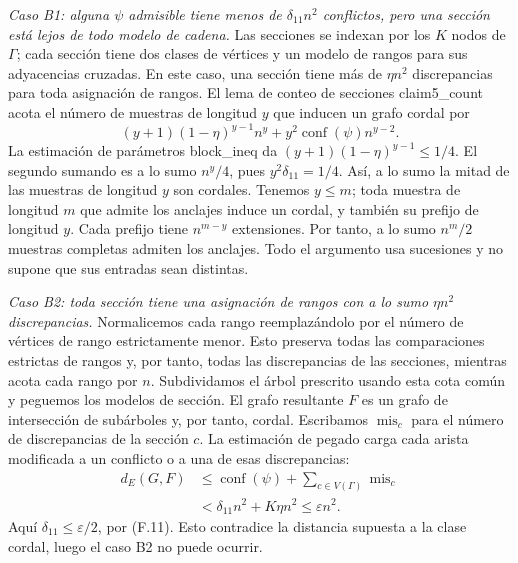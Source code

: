 \documentclass[spanish,11pt,a4paper]{article}
\begin{document}
\emph{Caso B1: alguna \(\psi\) admisible tiene menos de \(\delta_{11}n^2\) conflictos, pero una sección está lejos de todo modelo de cadena.} Las secciones se indexan por los \(K\) nodos de \(\Gamma\); cada sección tiene dos clases de vértices y un modelo de rangos para sus adyacencias cruzadas. En este caso, una sección tiene más de \(\eta n^2\) discrepancias para toda asignación de rangos. El lema de conteo de secciones {\ttfamily\small claim5\_\discretionary{\hbox{\ensuremath{\hookrightarrow}}}{}{}count} acota el número de muestras de longitud \(y\) que inducen un grafo cordal por \[
(y+1)(1-\eta)^{y-1}n^y+
y^2\operatorname{conf}(\psi)n^{y-2}.
\] La estimación de parámetros {\ttfamily\small block\_\discretionary{\hbox{\ensuremath{\hookrightarrow}}}{}{}ineq} da \((y+1)(1-\eta)^{y-1}\le1/4\). El segundo sumando es a lo sumo \(n^y/4\), pues \(y^2\delta_{11}=1/4\). Así, a lo sumo la mitad de las muestras de longitud \(y\) son cordales. Tenemos \(y\le m\); toda muestra de longitud \(m\) que admite los anclajes induce un cordal, y también su prefijo de longitud \(y\). Cada prefijo tiene \(n^{m-y}\) extensiones. Por tanto, a lo sumo \(n^m/2\) muestras completas admiten los anclajes. Todo el argumento usa sucesiones y no supone que sus entradas sean distintas.

\emph{Caso B2: toda sección tiene una asignación de rangos con a lo sumo \(\eta n^2\) discrepancias.} Normalicemos cada rango reemplazándolo por el número de vértices de rango estrictamente menor. Esto preserva todas las comparaciones estrictas de rangos y, por tanto, todas las discrepancias de las secciones, mientras acota cada rango por \(n\). Subdividamos el árbol prescrito usando esta cota común y peguemos los modelos de sección. El grafo resultante \(F\) es un grafo de intersección de subárboles y, por tanto, cordal. Escribamos \(\operatorname{mis}_c\) para el número de discrepancias de la sección \(c\). La estimación de pegado carga cada arista modificada a un conflicto o a una de esas discrepancias: \[
\begin{aligned}
d_E(G,F)&\le\operatorname{conf}(\psi)+
             \sum_{c\in V(\Gamma)}\operatorname{mis}_c\\
&<\delta_{11}n^2+K\eta n^2
\le\varepsilon n^2.
\end{aligned}
\tag{F.12}
\] Aquí \(\delta_{11}\le\varepsilon/2\), por (F.11). Esto contradice la distancia supuesta a la clase cordal, luego el caso B2 no puede ocurrir.
\end{document}
